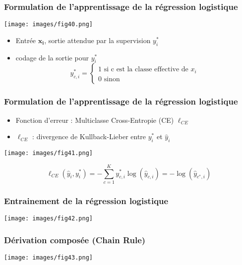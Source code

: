 \documentclass[9pt]{beamer}
\newcommand \ve[1]{\mathbf{#1}}
\begin{document}
\begin{frame}
\frametitle{Formulation de l'apprentissage de la régression logistique}
\begin{center}
\texttt{[image: images/fig40.png]}
\end{center}
\begin{itemize}
\item Entrée $\ve{x_i}$, sortie attendue par la supervision $y_i^*$
\item codage de la sortie pour $y_i^*$
\[
y_{c,i}^*= \begin{cases}
1 \text{ si c est la classe effective de }x_i\\
0 \text{ sinon}
\end{cases}
\]
\end{itemize}
\end{frame}

\begin{frame}
\frametitle{Formulation de l'apprentissage de la régression logistique}
\begin{itemize}
\item Fonction d'erreur : Multiclasse Cross-Entropie (CE) $\ell_{CE}$
\item $\ell_{CE}$ : divergence de Kullback-Lieber entre $y_i^*$ et $\hat{y}_i$ 
\end{itemize}

\begin{center}
\texttt{[image: images/fig41.png]}
\end{center}

\begin{alertblock}{}
\[
\ell_{CE}(\hat{y}_i, y_i^*) = -\sum_{c=1}^K y_{c,i}^*\log(\hat{y}_{c,i}) = - \log(\hat{y}_{{c^*},i})
\]
\end{alertblock}
\end{frame}

\begin{frame}
\frametitle{Entrainement de la régression logistique}
\begin{center}
\texttt{[image: images/fig42.png]}
\end{center}
\end{frame}

\begin{frame}
\frametitle{Dérivation composée (Chain Rule)}
\begin{center}
\texttt{[image: images/fig43.png]}
\end{center}
\end{frame}
\end{document}

